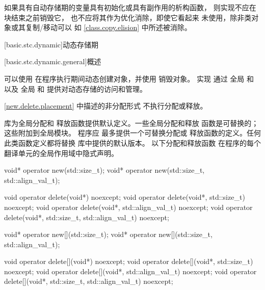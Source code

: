 \pnum
如果具有自动存储期的变量具有初始化或具有副作用的析构函数，
则实现不应在块结束之前销毁它，
也不应将其作为优化消除，即使它看起来
未使用，除非类对象或其复制/移动可以
如 \ref{class.copy.elision} 中所述被消除。

[basic.stc.dynamic]{动态存储期}%

[basic.stc.dynamic.general]{概述}%

\pnum
可以使用
%
 在程序执行期间动态创建对象，并使用
%
 销毁对象。\Cpp{} 实现
通过
全局 
 和
 以及
全局 
 和
 提供对动态存储的访问和管理。
\begin{note}
\ref{new.delete.placement} 中描述的非分配形式
不执行分配或释放。
\end{note}

\pnum
库为全局分配和
释放函数提供默认定义。一些全局分配和释放
函数是可替换的；
这些附加到全局模块。
\Cpp{} 程序应
最多提供一个可替换分配或
释放函数的定义。任何此类函数定义都将替换
库中提供的默认版本。
以下分配和释放函数
在程序的每个翻译单元的全局作用域中隐式声明。

\begin{codeblock}
void* operator new(std::size_t);
void* operator new(std::size_t, std::align_val_t);

void operator delete(void*) noexcept;
void operator delete(void*, std::size_t) noexcept;
void operator delete(void*, std::align_val_t) noexcept;
void operator delete(void*, std::size_t, std::align_val_t) noexcept;

void* operator new[](std::size_t);
void* operator new[](std::size_t, std::align_val_t);

void operator delete[](void*) noexcept;
void operator delete[](void*, std::size_t) noexcept;
void operator delete[](void*, std::align_val_t) noexcept;
void operator delete[](void*, std::size_t, std::align_val_t) noexcept;
\end{codeblock}

